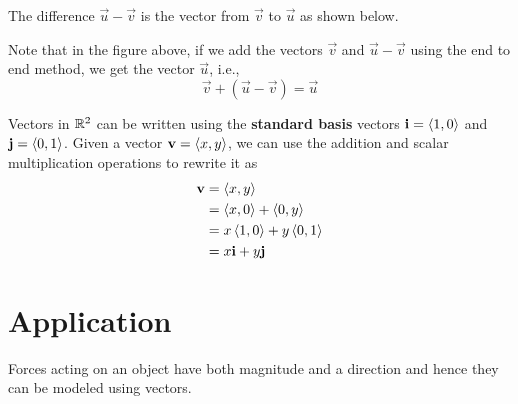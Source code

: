 \documentclass[handout]{ximera}
\begin{document}
The difference $\vec{u} - \vec{v}$ is the vector from $\vec{v}$ to $\vec{u}$ as shown below.
\begin{image}
\end{image}
Note that in the figure above, if we add the vectors $\vec{v}$ and $\vec{u} -\vec{v}$ using the end to end method, 
we get the vector $\vec{u}$, i.e.,
\[
\vec{v} + \left(\vec{u} -\vec{v}\right) = \vec{u}
\]

Vectors in $\mathbb R^2$ can be written using the {\bf standard basis} vectors $\mathbf{i} = \left\langle 1,0\right\rangle$ and $\mathbf{j} = \left\langle 0,1\right\rangle$.  
Given a vector $\mathbf{v} = \left\langle x,y\right\rangle$, we can use the addition and scalar multiplication operations to rewrite it as
\begin{align*}
\mathbf{v} &= \left\langle x,y\right\rangle\\
         &= \left\langle x,0\right\rangle + \left\langle 0,y\right\rangle\\
         &= x\left\langle 1,0\right\rangle + y \left\langle 0,1\right\rangle\\
         &= x\mathbf{i} + y\mathbf{j}
\end{align*}



\section{Application}
Forces acting on an object have both magnitude and a direction and hence they can be modeled using vectors.
\end{document}
